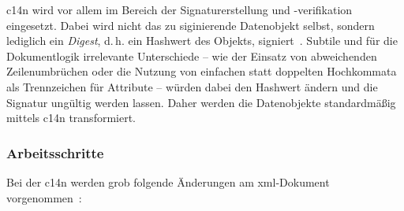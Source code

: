 \acrlong{c14n} wird vor allem im Bereich der Signaturerstellung und -verifikation eingesetzt. Dabei wird nicht das zu siginierende Datenobjekt selbst, sondern lediglich ein \emph{Digest}, d.\,h. ein Hashwert des Objekts, signiert~\cite[Abschnitt 2.0]{xmlsig}. Subtile und für die Dokumentlogik irrelevante Unterschiede -- wie der Einsatz von abweichenden Zeilenumbrüchen oder die Nutzung von einfachen statt doppelten Hochkommata als Trennzeichen für Attribute -- würden dabei den Hashwert ändern und die Signatur ungültig werden lassen. Daher werden die Datenobjekte standardmäßig mittels \acrlong{c14n} transformiert.~\cite[Abschnitt 4.3.3.2]{xmlsig}

\subsubsection{Arbeitsschritte}
\label{sec:c14nsteps}

Bei der \acrlong{c14n} werden grob folgende Änderungen am
\acrshort{xml}-Dokument vorgenommen~\cite[Abschnitt 1.1]{c14n}:


